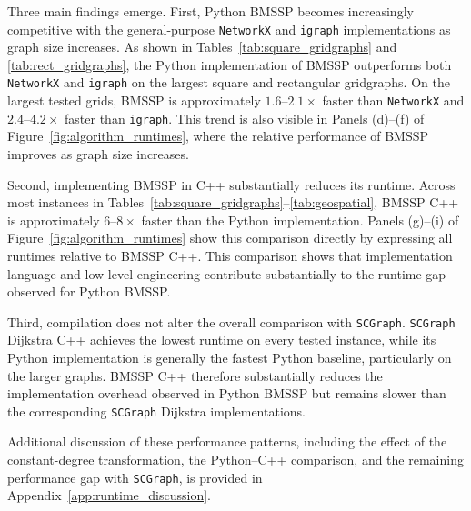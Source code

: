 \documentclass[ijoc,blindrev]{informs3} %
\begin{document}
{Three main findings emerge. First, Python BMSSP becomes increasingly competitive with the general-purpose \texttt{NetworkX} and \texttt{igraph} implementations as graph size increases. As shown in Tables~\ref{tab:square_gridgraphs} and \ref{tab:rect_gridgraphs}, the Python implementation of BMSSP outperforms both \texttt{NetworkX} and \texttt{igraph} on the largest square and rectangular gridgraphs. On the largest tested grids, BMSSP is approximately $1.6$--$2.1\times$ faster than \texttt{NetworkX} and $2.4$--$4.2\times$ faster than \texttt{igraph}. This trend is also visible in Panels (d)--(f) of Figure~\ref{fig:algorithm_runtimes}, where the relative performance of BMSSP improves as graph size increases.

Second, implementing BMSSP in C++ substantially reduces its runtime. Across most instances in Tables~\ref{tab:square_gridgraphs}--\ref{tab:geospatial}, BMSSP C++ is approximately $6$--$8\times$ faster than the Python implementation. Panels (g)--(i) of Figure~\ref{fig:algorithm_runtimes} show this comparison directly by expressing all runtimes relative to BMSSP C++. This comparison shows that implementation language and low-level engineering contribute substantially to the runtime gap observed for Python BMSSP.

Third, compilation does not alter the overall comparison with \texttt{SCGraph}. \texttt{SCGraph} Dijkstra C++ achieves the lowest runtime on every tested instance, while its Python implementation is generally the fastest Python baseline, particularly on the larger graphs. BMSSP C++ therefore substantially reduces the implementation overhead observed in Python BMSSP but remains slower than the corresponding \texttt{SCGraph} Dijkstra implementations.

Additional discussion of these performance patterns, including the effect of
the constant-degree transformation, the Python--C++ comparison, and the
remaining performance gap with \texttt{SCGraph}, is provided in
Appendix~\ref{app:runtime_discussion}.
}
\end{document}
